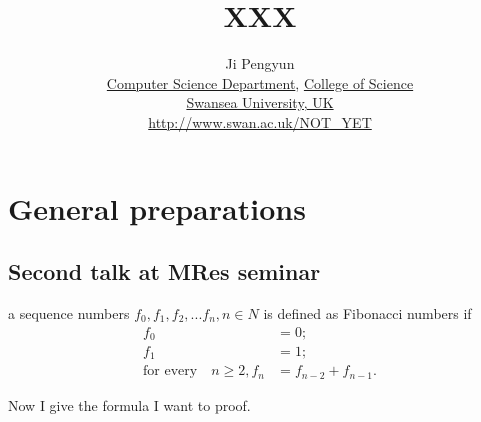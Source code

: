 \documentclass{report}
\begin{document}
\title{XXX}
\author{Ji Pengyun\\
  \href{http://www.swan.ac.uk/compsci/}{Computer Science Department}, \href{http://www.swan.ac.uk/science/}{College of Science}\\
   \href{http://www.swan.ac.uk/}{Swansea University, UK}\\
  {\small \url{http://www.swan.ac.uk/NOT_YET}}
}



\maketitle

\tableofcontents

\chapter{General preparations}
\label{cha:Generalpreparations}


\section{Second talk at MRes seminar}
\label{sec:SecondtalkMRes}

\begin{defi}\label{def:cartesianprod}
a sequence numbers $f_0, f_1, f_2,...f_n, n\in N$ is defined as Fibonacci numbers if
\begin{align*}
f_0& = 0;\\
f_1& = 1;\\
\text{for every}\quad n \geqslant 2, f_n& = f_{n-2}+f_{n-1}.
\end{align*}
\end{defi}
Now I give the formula I want to proof.
\end{document}
